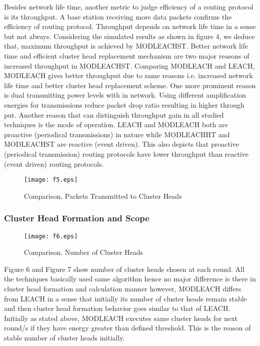 \documentclass[10pt, conference, compsocconf]{IEEEtran}
\begin{document}
Besides network life time, another metric to judge efficiency of a routing protocol is its throughput. A base station receiving more data packets confirms the efficiency of routing protocol. Throughput depends on network life time in a sense but not always. Considering the simulated results as shown in figure $4$, we deduce that, maximum throughput is achieved by MODLEACHST. Better network life time and efficient cluster head replacement mechanism are two major reasons of increased throughput in MODLEACHST. Comparing MODLEACH and LEACH, MODLEACH gives better throughput due to same reasons i.e. increased network life time and better cluster head replacement scheme. One more prominent reason is dual transmitting power levels with in network. Using different amplification energies for transmissions reduce packet drop ratio resulting in higher through put. Another reason that can distinguish throughput gain in all studied techniques is the mode of operation. LEACH and MODLEACH both are proactive (periodical transmissions) in nature while MODLEACHHT and MODLEACHST are reactive (event driven). This also depicts that proactive (periodical transmission) routing protocols have lower throughput than reactive (event driven) routing protocols.

\begin{figure}
\begin{center}
\texttt{[image: f5.eps]}
\caption{Comparison, Packets Transmitted to Cluster Heads}
\end{center}
\end{figure}

\subsubsection{Cluster Head Formation and Scope}

\begin{figure}
\begin{center}
\texttt{[image: f6.eps]}
\caption{Comparison, Number of  Cluster Heads}
\end{center}
\end{figure}

Figure $6$ and Figure $7$ show number of cluster heads chosen at each round. All the techniques basically used same algorithm hence no major difference is there in cluster head formation and calculation manner however, MODLEACH differs from LEACH in a sense that initially its number of cluster heads remain stable and then cluster head formation behavior goes similar to that of LEACH. Initially as stated above, MODLEACH executes same cluster heads for next round/s if they have energy greater than defined threshold. This is the reason of stable number of cluster heads initially.
\end{document}
